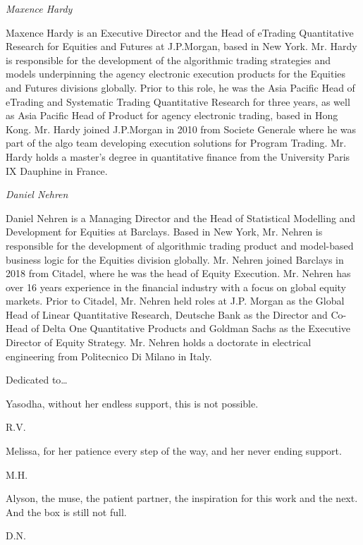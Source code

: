 {\noindent\large\itshape Maxence Hardy} \medskip

\noindent Maxence Hardy is an Executive Director and the Head of eTrading Quantitative Research for Equities and Futures at J.P.Morgan, based in New York. Mr. Hardy is responsible for the development of the algorithmic trading strategies and models underpinning the agency electronic execution products for the Equities and Futures divisions globally. Prior to this role, he was the Asia Pacific Head of eTrading and Systematic Trading Quantitative Research for three years, as well as Asia Pacific Head of Product for agency electronic trading, based in Hong Kong. Mr. Hardy joined J.P.Morgan in 2010 from Societe Generale where he was part of the algo team developing execution solutions for Program Trading. Mr. Hardy holds a master's degree in quantitative finance from the University Paris IX Dauphine in France. \bigskip


{\noindent\large\itshape Daniel Nehren} \medskip

\noindent Daniel Nehren is a Managing Director and the Head of Statistical Modelling and Development for Equities at Barclays. Based in New York, Mr. Nehren is responsible for the development of algorithmic trading product and model-based business logic for the Equities division globally. Mr. Nehren joined Barclays in 2018 from Citadel, where he was the head of Equity Execution. Mr. Nehren has over 16 years experience in the financial industry with a focus on global equity markets. Prior to Citadel, Mr. Nehren held roles at J.P. Morgan as the Global Head of Linear Quantitative Research, Deutsche Bank as the Director and Co-Head of Delta One Quantitative Products and Goldman Sachs as the Executive Director of Equity Strategy. Mr. Nehren holds a doctorate in electrical engineering from Politecnico Di Milano in Italy.



\newpage



Dedicated to\dots \vspace{0.5cm}


\begin{minipage}[t]{0.8\textwidth}
	\raggedright
		Yasodha, without her endless support, this is not possible. \par
  	\raggedleft
  	R.V.
\end{minipage} \vspace{1cm}


\begin{minipage}[t]{0.8\textwidth}
	\raggedright
		Melissa, for her patience every step of the way, and her never ending support. \par
  	\raggedleft
  	M.H.
\end{minipage} \vspace{1cm}


\begin{minipage}[t]{0.8\textwidth}
	\raggedright
		Alyson, the muse, the patient partner, the inspiration for this work and the next. And the box is still not full. \par
  	\raggedleft
  	D.N.
\end{minipage} 